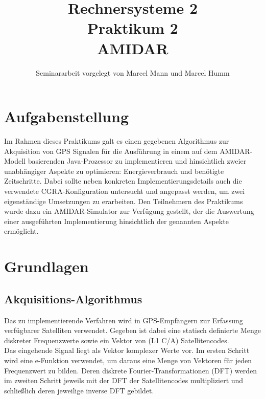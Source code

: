 \documentclass[parskip,
							 oneside,
							 11pt,
							 noheadingspace,
							 accentcolor=tud1d,
							 bigchapter,
							 colorback]{tudreport}
\title{\textbf{Rechnersysteme 2 \\ Praktikum 2 \\ AMIDAR}}
\subtitle{Seminararbeit vorgelegt von Marcel Mann und Marcel Humm}
\begin{document}
\maketitle
\cleardoublepage

\pagestyle{empty}


\pagestyle{headings}


\chapter{Aufgabenstellung}
Im Rahmen dieses Praktikums galt es einen gegebenen Algorithmus zur Akquisition von GPS Signalen für die Ausführung in einem auf dem AMIDAR-Modell basierenden Java-Prozessor zu implementieren und hinsichtlich zweier unabhängiger Aspekte zu optimieren: Energieverbrauch und benötigte Zeitschritte. Dabei sollte neben konkreten Implementierungsdetails auch die verwendete CGRA-Konfiguration untersucht und angepasst werden, um zwei eigenständige Umsetzungen zu erarbeiten. Den Teilnehmern des Praktikums wurde dazu ein AMIDAR-Simulator zur Verfügung gestellt, der die Auswertung einer ausgeführten Implementierung hinsichtlich der genannten Aspekte ermöglicht.

\chapter{Grundlagen}
\section{Akquisitions-Algorithmus}
Das zu implementierende Verfahren wird in GPS-Empfängern zur Erfassung verfügbarer Satelliten verwendet. Gegeben ist dabei eine statisch definierte Menge diskreter Frequenzwerte sowie ein Vektor von (L1 C/A) Satellitencodes.\\

Das eingehende Signal liegt als Vektor komplexer Werte vor. Im ersten Schritt wird eine e-Funktion verwendet, um daraus eine Menge von Vektoren für jeden Frequenzwert zu bilden. Deren diskrete Fourier-Transformationen (DFT) werden im zweiten Schritt jeweils mit der DFT der Satellitencodes multipliziert und schließlich deren jeweilige inverse DFT gebildet.\\
\end{document}
